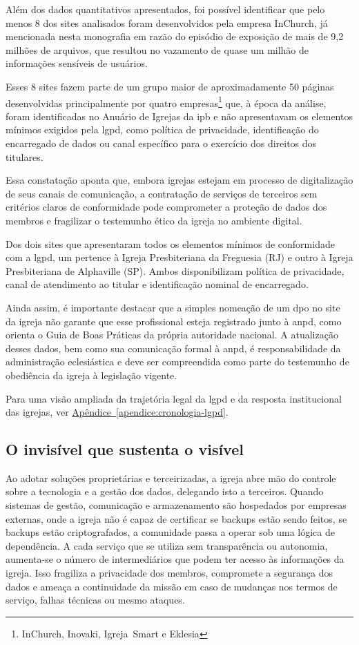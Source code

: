 Além dos dados quantitativos apresentados, foi possível identificar que pelo menos 8 dos sites analisados foram desenvolvidos pela empresa \mbox{InChurch}, já mencionada nesta monografia em razão do episódio de exposição de mais de 9,2 milhões de arquivos, que resultou no vazamento de quase um milhão de informações sensíveis de usuários\cite{almeida_inchurch_2024}.

Esses 8 sites fazem parte de um grupo maior de aproximadamente 50 páginas desenvolvidas principalmente por quatro empresas\footnote{\mbox{InChurch}, \mbox{Inovaki}, \mbox{Igreja Smart} e \mbox{Eklesia}} que, à época da análise, foram identificadas no Anuário de Igrejas da \gls{ipb} e não apresentavam os elementos mínimos exigidos pela \gls{lgpd}, como política de privacidade, identificação do encarregado de dados ou canal específico para o exercício dos direitos dos titulares.

Essa constatação aponta que, embora igrejas estejam em processo de digitalização de seus canais de comunicação, a contratação de serviços de terceiros sem critérios claros de conformidade pode comprometer a proteção de dados dos membros e fragilizar o testemunho ético da igreja no ambiente digital.

Dos dois sites que apresentaram todos os elementos mínimos de conformidade com a \gls{lgpd}, um pertence à Igreja Presbiteriana da Freguesia (RJ) e outro à Igreja Presbiteriana de Alphaville (SP). Ambos disponibilizam política de privacidade, canal de atendimento ao titular e identificação nominal de encarregado.

Ainda assim, é importante destacar que a simples nomeação de um \gls{dpo} no site da igreja não garante que esse profissional esteja registrado junto à \gls{anpd}, como orienta o Guia de Boas Práticas da própria autoridade nacional. A atualização desses dados, bem como sua comunicação formal à \gls{anpd}, é responsabilidade da administração eclesiástica e deve ser compreendida como parte do testemunho de obediência da igreja à legislação vigente.

Para uma visão ampliada da trajetória legal da \gls{lgpd} e da resposta institucional das igrejas, ver \hyperref[apendice:cronologia-lgpd]{Apêndice~\ref*{apendice:cronologia-lgpd}}.

\subsection{O invisível que sustenta o visível}

Ao adotar soluções proprietárias e terceirizadas, a igreja abre mão do controle sobre a tecnologia e a gestão dos dados, delegando isto a terceiros. Quando sistemas de gestão, comunicação e armazenamento são hospedados por empresas externas, onde a igreja não é capaz de certificar se backups estão sendo feitos, se backups estão criptografados, a comunidade passa a operar sob uma lógica de dependência. A cada serviço que se utiliza sem transparência ou autonomia, aumenta-se o número de intermediários que podem ter acesso às informações da igreja. Isso fragiliza a privacidade dos membros, compromete a segurança dos dados e ameaça a continuidade da missão em caso de mudanças nos termos de serviço, falhas técnicas ou mesmo ataques.

